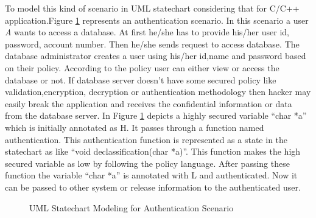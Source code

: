 To model this kind of scenario in UML statechart considering that for C/C++ application.Figure \ref{authentication_scenario}  represents an authentication scenario. In this scenario a user \emph{A} wants to access a database. At first he/she has to provide his/her user id, password, account number. Then he/she sends request to access database. The database administrator creates a user using his/her id,name and password based on their policy. According to the policy user can either view or access the database or not. If database server doesn't have some secured policy like validation,encryption, decryption or authentication methodology then hacker may easily break the application and receives the confidential information or data from the database server. In Figure \ref{authentication_scenario} depicts a highly secured variable \enquote{char *a} which is initially annotated as H. It passes through a function named authentication. This authentication function is represented as a state in the statechart as like \enquote{void declassification(char *a)}. This function makes the high secured variable as low by following the policy language. After passing these function the variable \enquote{char *a} is annotated with L and authenticated. Now it can be passed to other system or release information to the authenticated user.

\begin{figure}[htbp]
	\centering
	\label{authentication_scenario}
	\caption{UML Statechart Modeling for Authentication Scenario}
\end{figure}


